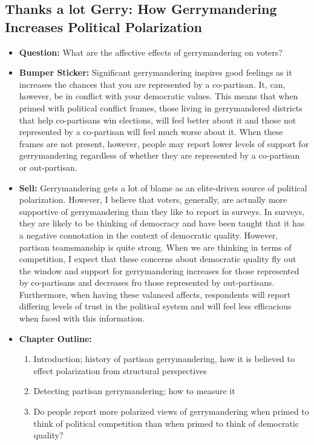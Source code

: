 \documentclass[12pt]{article}
\begin{document}
\subsection{Thanks a lot Gerry: How Gerrymandering Increases Political Polarization}
    \begin{itemize}
        \item \textbf{Question:} What are the affective effects of gerrymandering on voters?
        \item \textbf{Bumper Sticker:} Significant gerrymandering inspires good feelings as it increases the chances that you are represented by a co-partisan. It, can, however, be in conflict with your democratic values. This means that when primed with political conflict frames, those living in gerrymandered districts that help co-partisans win elections, will feel better about it and those not represented by a co-partisan will feel much worse about it. When these frames are not present, however, people may report lower levels of support for gerrymandering regardless of whether they are represented by a co-partisan or out-partisan.
        \item \textbf{Sell:} Gerrymandering gets a lot of blame as an elite-driven source of political polarization. However, I believe that voters, generally, are actually more supportive of gerrymandering than they like to report in surveys. In surveys, they are likely to be thinking of democracy and have been taught that it has a negative connotation in the context of democratic quality. However, partisan teamsmanship is quite strong. When we are thinking in terms of competition, I expect that these concerns about democratic quality fly out the window and support for gerrymandering increases for those represented by co-partisans and decreases fro those represented by out-partisans. Furthermore, when having these valanced affects, respondents will report differing levels of trust in the political system and will feel less efficacious when faced with this information.
        \item \textbf{Chapter Outline:}
        \begin{enumerate}
            \item Introduction; history of partisan gerrymandering, how it is believed to effect polarization from structural perspectives
            \item Detecting partisan gerrymandering; how to measure it
            \item Do people report more polarized views of gerrymandering when primed to think of political competition than when primed to think of democratic quality?

\end{enumerate}
\end{itemize}
\end{document}

